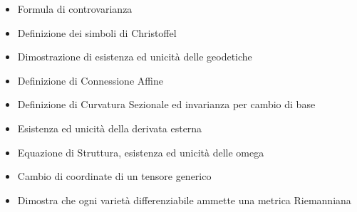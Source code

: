\documentclass[a4paper,NoNotes,GeneralMath]{stdmdoc}
\begin{document}
\begin{itemize}
\item Formula di controvarianza
\item Definizione dei simboli di Christoffel
\item Dimostrazione di esistenza ed unicità delle geodetiche
\item Definizione di Connessione Affine
\item Definizione di Curvatura Sezionale ed invarianza per cambio di base
\item Esistenza ed unicità della derivata esterna
\item Equazione di Struttura, esistenza ed unicità delle omega
\item Cambio di coordinate di un tensore generico
\item Dimostra che ogni varietà differenziabile ammette una metrica Riemanniana
\end{itemize}
        
\end{document}
